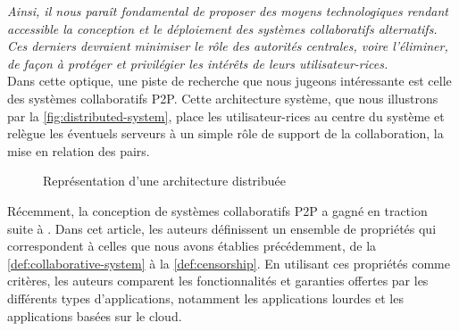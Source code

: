 \emph{Ainsi, il nous paraît fondamental de proposer des moyens technologiques rendant accessible la conception et le déploiement des systèmes collaboratifs alternatifs.
Ces derniers devraient minimiser le rôle des autorités centrales, voire l'éliminer, de façon à protéger et privilégier les intérêts de leurs utilisateur-rices.}\\

Dans cette optique, une piste de recherche que nous jugeons intéressante est celle des systèmes collaboratifs \acf{P2P}.
Cette architecture système, que nous illustrons par la \autoref{fig:distributed-system}, place les utilisateur-rices au centre du système et relègue les éventuels serveurs à un simple rôle de support de la collaboration, \eg la mise en relation des pairs.

\begin{figure}[!ht]
  \centering
  \caption[Caption for distributed-system]{Représentation d'une architecture distribuée \cite{1964-distributed-communications-networks-baran}}
  \label{fig:distributed-system}
\end{figure}

Récemment, la conception de systèmes collaboratifs \ac{P2P} a gagné en traction suite à \cite{localfirstsoftware2019}.
Dans cet article, les auteurs définissent un ensemble de propriétés qui correspondent à celles que nous avons établies précédemment, de la \autoref{def:collaborative-system} à la \autoref{def:censorship}.
En utilisant ces propriétés comme critères, les auteurs comparent les fonctionnalités et garanties offertes par les différents types d'applications, notamment les applications lourdes et les applications basées sur le cloud.

